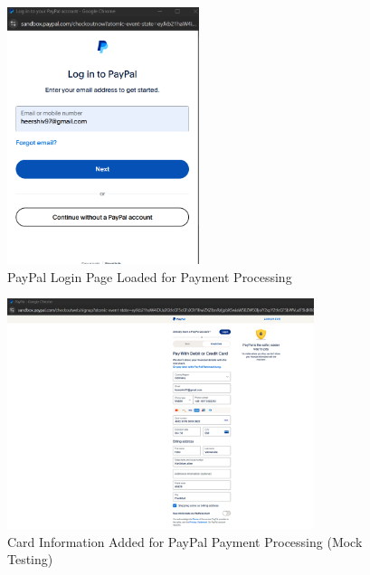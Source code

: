 \documentclass{llncs}
\begin{document}
\begin{figure}[H]
    \centering
    \includegraphics[width=0.5\textwidth]{../images/Paypal_Login.png}  %
    \vspace{3mm}  %
    \caption{PayPal Login Page Loaded for Payment Processing}
    \label{fig:Webshop_7}
\end{figure}
\vspace{10mm}  %

\begin{figure}[H]
    \centering
    \includegraphics[width=0.8\textwidth]{../images/Proceed_payment_Paypal.png}  %
    \vspace{3mm}  %
    \caption{Card Information Added for PayPal Payment Processing (Mock Testing)}
    \label{fig:Webshop_8}
\end{figure}
\vspace{10mm}  %
\end{document}
